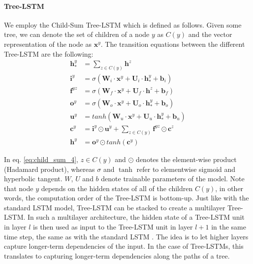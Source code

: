 \paragraph{Tree-LSTM} We employ the Child-Sum Tree-LSTM \cite{tai2015improved} which is defined as follows. Given some tree, we can denote the set of children of a node $y$ as $C(y)$ and the vector representation of the node as $\mathbf{x}^y$. The transition equations between the different Tree-LSTM are the following:
% 
\begin{align}\label{eq:tree_lstm_encocer}
    \mathbf{h}^y_* &= \sum_{z \in C(y)} \mathbf{h}^z \\
    \mathbf{i}^y &= \sigma(\mathbf{W}_{i} \cdot \mathbf{x}^y + \mathbf{U}_{i} \cdot \mathbf{h}^y_* + \mathbf{b}_{i})  \\ 
    \mathbf{f}^{yz} &= \sigma(\mathbf{W}_{f} \cdot \mathbf{x}^y + \mathbf{U}_{f} \cdot \mathbf{h}^z + \mathbf{b}_{f}) \\\label{eq:child_sum_4}
    \mathbf{o}^y &= \sigma(\mathbf{W}_{o} \cdot \mathbf{x}^y + \mathbf{U}_{o} \cdot \mathbf{h}^y_* + \mathbf{b}_{o}) \\
    \mathbf{u}^y &= tanh(\mathbf{W}_{u} \cdot \mathbf{x}^y + \mathbf{U}_{u} \cdot \mathbf{h}^y_* + \mathbf{b}_{u}) \\
    \mathbf{c}^y &= \mathbf{i}^y \odot \mathbf{u}^y + \sum_{z \in C(y)} \mathbf{f}^{yz} \odot \mathbf{c}^z \\
    \mathbf{h}^y &= \mathbf{o}^y \odot tanh(\mathbf{c}^y)
\end{align}

In eq. \ref{eq:child_sum_4}, $z \in C(y)$ and $\odot$ denotes the element-wise product (Hadamard product), whereas $\sigma$ and $\tanh$ refer to elementwise sigmoid and hyperbolic tangent. 
$W$, $U$ and $b$ denote trainable parameters of the model. 
Note that node $y$ depends on the hidden states of all of the children $C(y)$, in other words, the computation order of the Tree-LSTM is bottom-up. 
Just like with the standard LSTM model, Tree-LSTM can be stacked to create a multilayer Tree-LSTM. 
In such a multilayer architecture, the hidden state of a Tree-LSTM unit in layer $l$ is then used as input to the Tree-LSTM unit in layer $l + 1$ in the same time step, the same as with the standard LSTM \cite{graves2013hybrid}. 
The idea is to let higher layers capture longer-term dependencies of the input. 
In the case of Tree-LSTMs, this translates to capturing longer-term dependencies along the paths of a tree.

